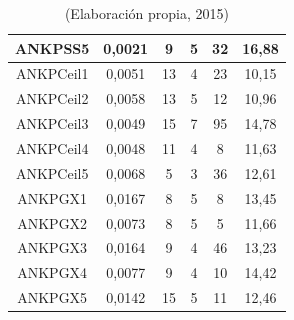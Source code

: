 \begin{table}[hbtp!]
\begin{center}
\begin{tabular}{cccccc}
ANKPSS5 & 0,0021 & 9 & 5 & 32 & 16,88 \\ \hline
ANKPCeil1 & 0,0051 & 13 & 4 & 23 & 10,15 \\
ANKPCeil2 & 0,0058 & 13 & 5 & 12 & 10,96 \\
ANKPCeil3 & 0,0049 & 15 & 7 & 95 & 14,78 \\
ANKPCeil4 & 0,0048 & 11 & 4 & 8 & 11,63 \\
ANKPCeil5 & 0,0068 & 5 & 3 & 36 & 12,61 \\ \hline
ANKPGX1 & 0,0167 & 8 & 5 & 8 & 13,45 \\
ANKPGX2 & 0,0073 & 8 & 5 & 5 & 11,66 \\
ANKPGX3 & 0,0164 & 9 & 4 & 46 & 13,23 \\
ANKPGX4 & 0,0077 & 9 & 4 & 10 & 14,42 \\
ANKPGX5 & 0,0142 & 15 & 5 & 11 & 12,46 \\
\hline
\end{tabular}
\end{center}
\caption*{(Elaboración propia, 2015)}
\end{table}

